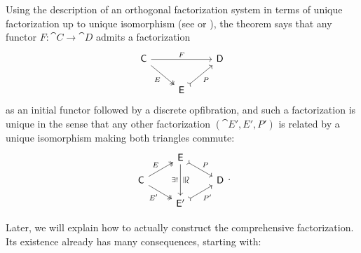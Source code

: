 \documentclass[11pt]{article}
\numberwithin{equation}{section}
\begin{document}
Using the description of an orthogonal factorization system in terms of unique
factorization up to unique isomorphism (see \cite[\mbox{Theorem 3.7}]{joyal2020}
or \cite[\mbox{Lemma 1.8}]{riehl2008}), the theorem says that any functor
$F: \cat{C} \to \cat{D}$ admits a factorization
\begin{equation*}
  \begin{tikzcd}
    {\cat{C}} && {\cat{D}} \\
    & {\cat{E}}
    \arrow["F", from=1-1, to=1-3]
    \arrow["E"', two heads, from=1-1, to=2-2]
    \arrow["P"', tail, from=2-2, to=1-3]
  \end{tikzcd}
\end{equation*}
as an initial functor followed by a discrete opfibration, and such a
factorization is unique in the sense that any other factorization
$(\cat{E}',E',P')$ is related by a unique isomorphism making both triangles
commute:
\begin{equation*}
  \begin{tikzcd}[row sep=small]
    & {\cat{E}} & \\
    {\cat{C}} && {\cat{D}} \\
    & {\cat{E}'}
    \arrow["P", tail, from=1-2, to=2-3]
    \arrow["{\exists!}"', from=1-2, to=3-2]
    \arrow["\cong"{marking, allow upside down}, shift left=2, draw=none, from=1-2, to=3-2]
    \arrow["E", two heads, from=2-1, to=1-2]
    \arrow["{E'}"', two heads, from=2-1, to=3-2]
    \arrow["{P'}"', tail, from=3-2, to=2-3]
  \end{tikzcd}.
\end{equation*}

Later, we will explain how to actually construct the comprehensive
factorization. Its existence already has many consequences, starting with:
\end{document}
